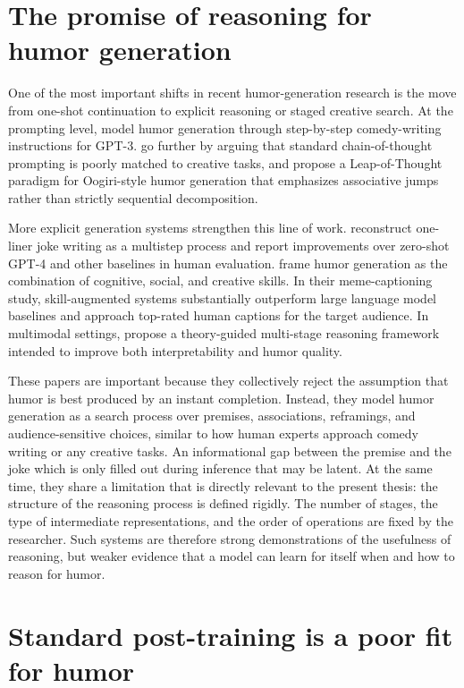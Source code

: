\section{The promise of reasoning for humor generation}

One of the most important shifts in recent humor-generation research is the move from one-shot continuation to explicit reasoning or staged creative search. At the prompting level, \citet{chen2023prompt} model humor generation through step-by-step comedy-writing instructions for GPT-3. \citet{zhong2024let} go further by arguing that standard chain-of-thought prompting is poorly matched to creative tasks, and propose a Leap-of-Thought paradigm for Oogiri-style humor generation that emphasizes associative jumps rather than strictly sequential decomposition.

More explicit generation systems strengthen this line of work. \citet{Tikhonov2024} reconstruct one-liner joke writing as a multistep process and report improvements over zero-shot GPT-4 and other baselines in human evaluation. \citet{Kim2025} frame humor generation as the combination of cognitive, social, and creative skills. In their meme-captioning study, skill-augmented systems substantially outperform large language model baselines and approach top-rated human captions for the target audience. In multimodal settings, \citet{ZhangJ2025} propose a theory-guided multi-stage reasoning framework intended to improve both interpretability and humor quality.

These papers are important because they collectively reject the assumption that humor is best produced by an instant completion. Instead, they model humor generation as a search process over premises, associations, reframings, and audience-sensitive choices, similar to how human experts approach comedy writing or any creative tasks. An informational gap between the premise and the joke which is only filled out during inference that may be latent. At the same time, they share a limitation that is directly relevant to the present thesis: the structure of the reasoning process is defined rigidly. The number of stages, the type of intermediate representations, and the order of operations are fixed by the researcher. Such systems are therefore strong demonstrations of the usefulness of reasoning, but weaker evidence that a model can learn for itself when and how to reason for humor.

\section{Standard post-training is a poor fit for humor}

